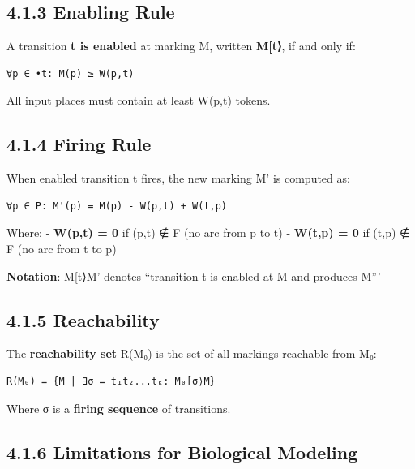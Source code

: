 \hypertarget{enabling-rule}{%
\subsection{4.1.3 Enabling Rule}\label{enabling-rule}}

A transition \textbf{t is enabled} at marking M, written
\textbf{M{[}t⟩}, if and only if:

\begin{lstlisting}
∀p ∈ •t: M(p) ≥ W(p,t)
\end{lstlisting}

All input places must contain at least W(p,t) tokens.

\hypertarget{firing-rule}{%
\subsection{4.1.4 Firing Rule}\label{firing-rule}}

When enabled transition t fires, the new marking M' is computed as:

\begin{lstlisting}
∀p ∈ P: M'(p) = M(p) - W(p,t) + W(t,p)
\end{lstlisting}

Where: - \textbf{W(p,t) = 0} if (p,t) ∉ F (no arc from p to t) -
\textbf{W(t,p) = 0} if (t,p) ∉ F (no arc from t to p)

\textbf{Notation}: M{[}t⟩M' denotes ``transition t is enabled at M and
produces M'''

\hypertarget{reachability}{%
\subsection{4.1.5 Reachability}\label{reachability}}

The \textbf{reachability set} R(M₀) is the set of all markings reachable
from M₀:

\begin{lstlisting}
R(M₀) = {M | ∃σ = t₁t₂...tₖ: M₀[σ⟩M}
\end{lstlisting}

Where σ is a \textbf{firing sequence} of transitions.

\hypertarget{limitations-for-biological-modeling}{%
\subsection{4.1.6 Limitations for Biological
Modeling}\label{limitations-for-biological-modeling}}

